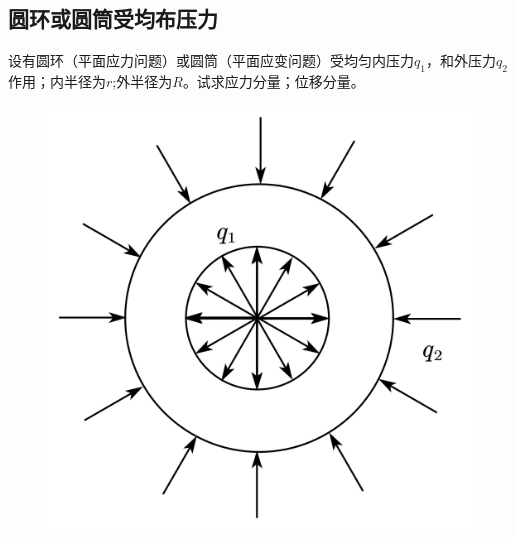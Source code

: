 \subsection{圆环或圆筒受均布压力}
\begin{example}
设有圆环（平面应力问题）或圆筒（平面应变问题）受均匀内压力$q_1$，和外压力$q_2$作用；内半径为$r$;外半径为$R$。试求应力分量；位移分量。
\end{example}
\begin{figure}[h]
	\centering
	\includegraphics[scale=0.4]{figure/4-5.png}
\end{figure}
